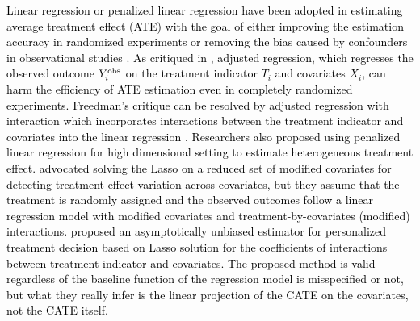 \documentclass[11pt,paper=letter]{scrartcl}
\def\obs{\textnormal{obs}}
\newcommand\hz[1]{\textcolor{black}{#1}}
\begin{document}
\hz{Linear regression or penalized linear regression have been adopted in estimating average treatment effect (ATE) with the goal of either improving the estimation accuracy in randomized experiments \cite{freedman2008regression,lin2013,bloniarz2015lasso} or removing the bias caused by confounders in observational studies \cite{belloni2013program}. As critiqued in \cite{freedman2008regression},  adjusted regression, which regresses the observed outcome $Y_i^\obs$ on the treatment indicator $T_i$ and covariates $X_i$, can harm the efficiency of ATE estimation even in completely randomized experiments. Freedman's critique can be resolved by adjusted regression with interaction which incorporates interactions between the treatment indicator and covariates into the linear regression \cite{lin2013}. Researchers also proposed using penalized linear regression for high dimensional setting to estimate heterogeneous treatment effect. \cite{tian2014lasso} advocated solving the Lasso on a reduced set of modified covariates for detecting treatment effect variation across covariates, but they assume that the treatment is randomly assigned and the observed outcomes follow a linear regression model with modified covariates and treatment-by-covariates (modified) interactions. \cite{jeng2018debiaselasso} proposed an asymptotically unbiased estimator for personalized treatment decision based on Lasso solution for the coefficients of interactions between treatment indicator and covariates. The proposed method is valid regardless of the baseline function of the regression model is misspecified or not, but what they really infer is the linear projection of the CATE on the covariates, not the CATE itself.}

\end{document}
